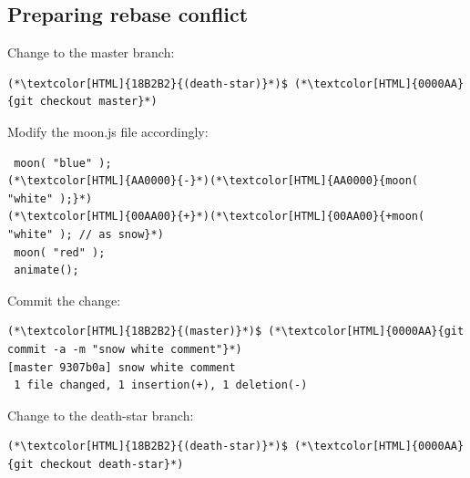 \subsection{Preparing rebase conflict}
\begin{frame}[fragile]
  \subslidetitle
  Change to the master branch:
   \begin{lstlisting}
(*\textcolor[HTML]{18B2B2}{(death-star)}*)$ (*\textcolor[HTML]{0000AA}{git checkout master}*)
\end{lstlisting}

  Modify the moon.js file accordingly:
  \begin{lstlisting}
 moon( "blue" );
(*\textcolor[HTML]{AA0000}{-}*)(*\textcolor[HTML]{AA0000}{moon( "white" );}*)
(*\textcolor[HTML]{00AA00}{+}*)(*\textcolor[HTML]{00AA00}{+moon( "white" ); // as snow}*)
 moon( "red" );
 animate();
\end{lstlisting}

  Commit the change:
  \begin{lstlisting}
(*\textcolor[HTML]{18B2B2}{(master)}*)$ (*\textcolor[HTML]{0000AA}{git commit -a -m "snow white comment"}*)
[master 9307b0a] snow white comment
 1 file changed, 1 insertion(+), 1 deletion(-)
\end{lstlisting}
  Change to the death-star branch:
   \begin{lstlisting}
(*\textcolor[HTML]{18B2B2}{(death-star)}*)$ (*\textcolor[HTML]{0000AA}{git checkout death-star}*)
\end{lstlisting}
\end{frame}




